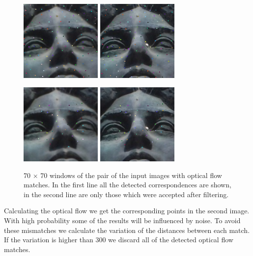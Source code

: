 \begin{figure}[h]
\centerline{
\includegraphics[width=4.0cm]{img/trackingpoints1.png}
\includegraphics[width=4.0cm]{img/trackingpoints2.png}}
\centerline{
\includegraphics[width=4.0cm]{img/trackingpoints1_filtered.png}
\includegraphics[width=4.0cm]{img/trackingpoints2_filtered.png}}
\caption{70 $\times$ 70 windows of the pair of the input images with optical flow matches.
 In the first line all the detected correspondences are shown, in the second line are only those which were accepted after filtering.}
\label{fig:trackingpoints}
\end{figure}

Calculating the optical flow we get the corresponding points in the second image.
With high probability some of the results will be influenced by noise.
To avoid these mismatches we calculate the variation of the distances between each match.
If the variation is higher than 300 we discard all of the detected optical flow matches.

